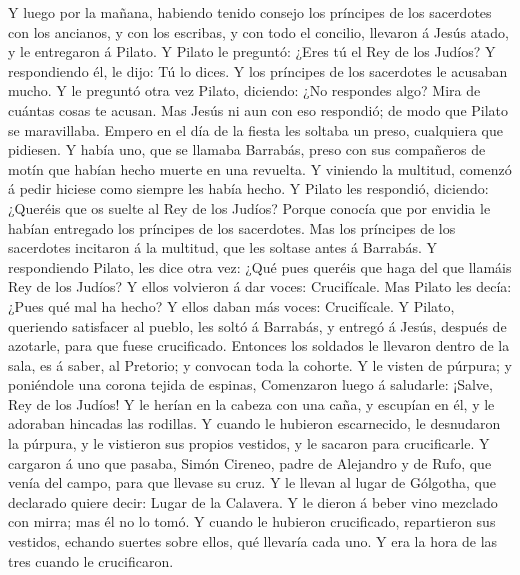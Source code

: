  Y luego por la mañana, habiendo tenido consejo los
príncipes de los sacerdotes con los ancianos, y con los escribas, y con
todo el concilio, llevaron á Jesús atado, y le entregaron á Pilato.
 Y Pilato le preguntó: ¿Eres tú el Rey de los Judíos? Y
respondiendo él, le dijo: Tú lo dices.  Y los príncipes de
los sacerdotes le acusaban mucho.  Y le preguntó otra vez
Pilato, diciendo: ¿No respondes algo? Mira de cuántas cosas te acusan.
 Mas Jesús ni aun con eso respondió; de modo que Pilato se
maravillaba.  Empero en el día de la fiesta les soltaba un
preso, cualquiera que pidiesen.  Y había uno, que se
llamaba Barrabás, preso con sus compañeros de motín que habían hecho
muerte en una revuelta.  Y viniendo la multitud, comenzó á
pedir hiciese como siempre les había hecho.  Y Pilato les
respondió, diciendo: ¿Queréis que os suelte al Rey de los Judíos?
 Porque conocía que por envidia le habían entregado los
príncipes de los sacerdotes.  Mas los príncipes de los
sacerdotes incitaron á la multitud, que les soltase antes á Barrabás.
 Y respondiendo Pilato, les dice otra vez: ¿Qué pues
queréis que haga del que llamáis Rey de los Judíos?  Y
ellos volvieron á dar voces: Crucifícale.  Mas Pilato les
decía: ¿Pues qué mal ha hecho? Y ellos daban más voces: Crucifícale.
 Y Pilato, queriendo satisfacer al pueblo, les soltó á
Barrabás, y entregó á Jesús, después de azotarle, para que fuese
crucificado.  Entonces los soldados le llevaron dentro de
la sala, es á saber, al Pretorio; y convocan toda la cohorte.
 Y le visten de púrpura; y poniéndole una corona tejida
de espinas,  Comenzaron luego á saludarle: ¡Salve, Rey de
los Judíos!  Y le herían en la cabeza con una caña, y
escupían en él, y le adoraban hincadas las rodillas.  Y
cuando le hubieron escarnecido, le desnudaron la púrpura, y le vistieron
sus propios vestidos, y le sacaron para crucificarle.  Y
cargaron á uno que pasaba, Simón Cireneo, padre de Alejandro y de Rufo,
que venía del campo, para que llevase su cruz.  Y le
llevan al lugar de Gólgotha, que declarado quiere decir: Lugar de la
Calavera.  Y le dieron á beber vino mezclado con mirra;
mas él no lo tomó.  Y cuando le hubieron crucificado,
repartieron sus vestidos, echando suertes sobre ellos, qué llevaría cada
uno.  Y era la hora de las tres cuando le crucificaron.
